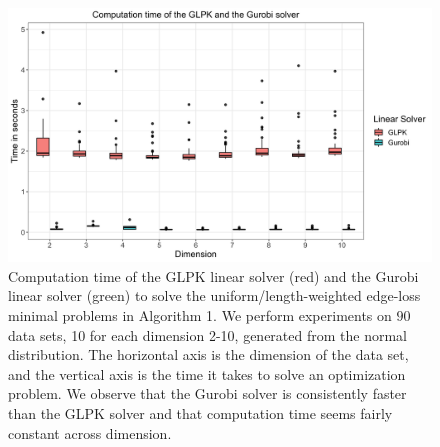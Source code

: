 \documentclass[11pt,onecolumn]{article}
\theoremstyle{plain}
\theoremstyle{definition}
\begin{document}
 \begin{figure}[h!]
 \begin{center}
 \includegraphics[width=1\textwidth]{figures/boxplots_glpk_gurobi.jpg}%
 \end{center}
 \caption{Computation time of the GLPK linear solver (red) and the Gurobi linear solver (green) to solve the uniform/length-weighted edge-loss minimal problems in Algorithm 1. We perform experiments on $90$ data sets, 10 for each dimension 2-10, generated from the normal distribution. The horizontal axis is the dimension of the data set, and the vertical axis is the time it takes to solve an optimization problem. We observe that the Gurobi solver is consistently faster than the GLPK solver and that computation time seems fairly constant across dimension.}\label{fig:glpk_gurobi}
 \end{figure}
\end{document}
